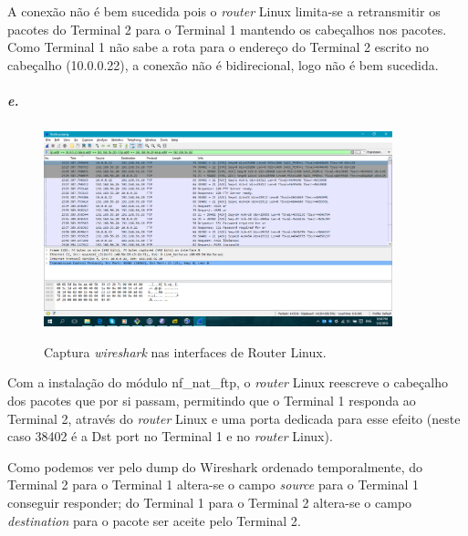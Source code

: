 A conexão não é bem sucedida pois o \textsf{\emph{router} Linux} limita-se 
a retransmitir os pacotes do \textsf{Terminal 2} para o \textsf{Terminal 1} 
mantendo os cabeçalhos nos pacotes. Como \textsf{Terminal 1} não sabe a rota 
para o endereço do \textsf{Terminal 2} escrito no cabeçalho (\textsf{10.0.0.22}), 
a conexão não é bidirecional, logo não é bem sucedida.

\subparagraph{e.}

\begin{figure}[h]
\centering
\includegraphics[width=0.9\textwidth, height=0.3\textheight]{5e.png}
\label{fig:5e}
\caption{Captura \emph{wireshark} nas interfaces de \textsf{Router Linux}.}
\end{figure}

Com a instalação do módulo \textsf{nf\_nat\_ftp}, o \textsf{\emph{router} Linux}
reescreve o cabeçalho dos pacotes que por si passam, permitindo que o
\textsf{Terminal 1} responda ao \textsf{Terminal 2}, através do 
\textsf{\emph{router} Linux} e uma porta dedicada para esse efeito 
(neste caso \textsf{38402} é a \textsf{Dst port} no \textsf{Terminal 1} e
no \textsf{\emph{router} Linux}).

Como podemos ver pelo dump do Wireshark ordenado temporalmente, do 
\textsf{Terminal 2} para o \textsf{Terminal 1} altera-se o campo 
\emph{source} para o \textsf{Terminal 1} conseguir responder; do 
\textsf{Terminal 1} para o \textsf{Terminal 2} altera-se o campo 
\emph{destination} para o pacote ser aceite pelo \textsf{Terminal 2}.
